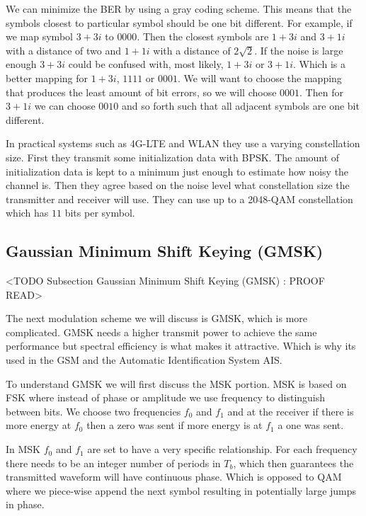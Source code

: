 We can minimize the \ac{BER} by using a gray coding scheme. This means that the symbols closest to particular symbol should be one bit different. For example, if we map symbol $3+3i$ to $0000$. Then the closest symbols are $1+3i$ and $3+1i$ with a distance of two and $1+1i$ with a distance of $2\sqrt{2}$. If the noise is large enough $3+3i$ could be confused with, most likely, $1+3i$ or $3+1i$. Which is a better mapping for $1+3i$, $1111$ or $0001$. We will want to choose the mapping that produces the least amount of bit errors, so we will choose $0001$. Then for $3+1i$ we can choose $0010$ and so forth such that all adjacent symbols are one bit different.

In practical systems such as \ac{4G-LTE} and \ac{WLAN} they use a varying constellation size. First they transmit some initialization data with \ac{BPSK}. The amount of initialization data is kept to a minimum just enough to estimate how noisy the channel is. Then they agree based on the noise level what constellation size the transmitter and receiver will use. They can use up to a 2048-\ac{QAM} constellation which has $11$ bits per symbol.	
	
\subsection{Gaussian Minimum Shift Keying (GMSK)}
	<TODO Subsection Gaussian Minimum Shift Keying (GMSK) : PROOF READ>

The next modulation scheme we will discuss is \ac{GMSK}, which is more complicated. \ac{GMSK} needs a higher transmit power to achieve the same performance but spectral efficiency is what makes it attractive. Which is why its used in the \ac{GSM} and the Automatic Identification System \ac{AIS}.

To understand \ac{GMSK} we will first discuss the \ac{MSK} portion. \ac{MSK} is based on \ac{FSK} where instead of phase or amplitude we use frequency to distinguish between bits. We choose two frequencies $f_0$ and $f_1$ and at the receiver if there is more energy at $f_0$ then a zero was sent if more energy is at $f_1$ a one was sent.

In \ac{MSK} $f_0$ and $f_1$ are set to have a very specific relationship. For each frequency there needs to be an integer number of periods in $T_b$, which then guarantees the transmitted waveform will have continuous phase. Which is opposed to \ac{QAM} where we piece-wise append the next symbol resulting in potentially large jumps in phase.

